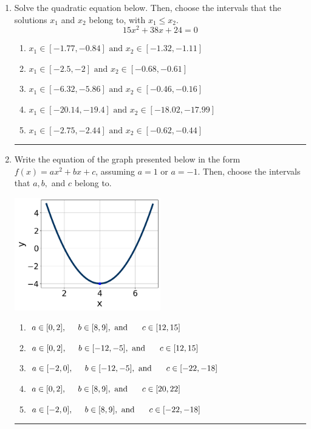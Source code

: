 \documentclass[14pt]{extbook}
\newcommand{\litem}[1]{\item#1\hspace*{-1cm}\rule{\textwidth}{0.4pt}}
\begin{document}
\begin{enumerate}
{\begin{enumerate}[label=\Alph*.]
\end{enumerate} }
\litem{
Solve the quadratic equation below. Then, choose the intervals that the solutions $x_1$ and $x_2$ belong to, with $x_1 \leq x_2$.\[ 15x^{2} +38 x + 24 = 0 \]\begin{enumerate}[label=\Alph*.]
\item \( x_1 \in [-1.77, -0.84] \text{ and } x_2 \in [-1.32, -1.11] \)
\item \( x_1 \in [-2.5, -2] \text{ and } x_2 \in [-0.68, -0.61] \)
\item \( x_1 \in [-6.32, -5.86] \text{ and } x_2 \in [-0.46, -0.16] \)
\item \( x_1 \in [-20.14, -19.4] \text{ and } x_2 \in [-18.02, -17.99] \)
\item \( x_1 \in [-2.75, -2.44] \text{ and } x_2 \in [-0.62, -0.44] \)

\end{enumerate} }
\litem{
Write the equation of the graph presented below in the form $f(x)=ax^2+bx+c$, assuming  $a=1$ or $a=-1$. Then, choose the intervals that $a, b,$ and $c$ belong to.
\begin{center}
    \includegraphics[width=0.5\textwidth]{../Figures/quadraticGraphToEquationCopyB.png}
\end{center}
\begin{enumerate}[label=\Alph*.]
\item \( a \in [0, 2], \hspace*{5mm} b \in [8, 9], \text{ and } \hspace*{5mm} c \in [12, 15] \)
\item \( a \in [0, 2], \hspace*{5mm} b \in [-12, -5], \text{ and } \hspace*{5mm} c \in [12, 15] \)
\item \( a \in [-2, 0], \hspace*{5mm} b \in [-12, -5], \text{ and } \hspace*{5mm} c \in [-22, -18] \)
\item \( a \in [0, 2], \hspace*{5mm} b \in [8, 9], \text{ and } \hspace*{5mm} c \in [20, 22] \)
\item \( a \in [-2, 0], \hspace*{5mm} b \in [8, 9], \text{ and } \hspace*{5mm} c \in [-22, -18] \)


\end{enumerate}}
\end{enumerate}
\end{document}
